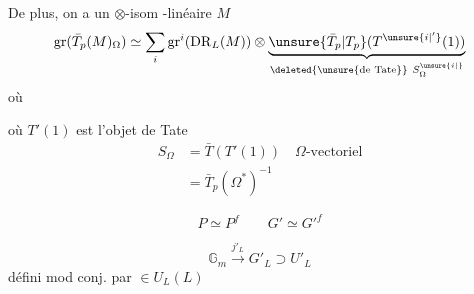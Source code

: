 De plus, on a un $\otimes$-isom -linéaire  $M$ 
\[
\operatorname{gr}(\bar T_p(M)_\Omega)\simeq\sum_i\operatorname{gr}^i(\mathrm{DR}_{L}(M))\otimes\underbrace{\unsure{\bar T_p|T_p}(T^{\unsure{i|'}}(1))}_{\deleted{\unsure{\text{de Tate}}}\ S_\Omega^{\unsure{i|{}}}}
\]
où

où $T'(1)$ est l'objet de Tate
\[\begin{aligned} S_\Omega&=\bar T(T'(1))\quad\Omega\text{-vectoriel}\\&=\bar T_p(\Omega^{*})^{-1}\end{aligned}\]

\[P\simeq P^f\qquad G'\simeq G'^{f}\]

\[\mathbb G_m\xrightarrow{j'_L}G'_L\supset U'_L\]
défini mod conj. par $\in U_L(L)$

